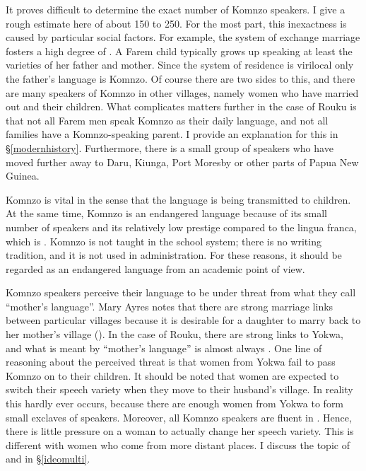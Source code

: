 It proves difficult to determine the exact number of Komnzo speakers. I give a rough estimate here of about 150 to 250. For the most part, this inexactness is caused by particular social factors. For example, the system of exchange marriage fosters a high degree of . A Farem child typically grows up speaking at least the varieties of her father and mother. Since the system of residence is virilocal only the father's language is Komnzo. Of course there are two sides to this, and there are many speakers of Komnzo in other villages, namely women who have married out and their children. What complicates matters further in the case of Rouku is that not all Farem men speak Komnzo as their daily language, and not all families have a Komnzo-speaking parent. I provide an explanation for this in {\S}\ref{modernhistory}. Furthermore, there is a small group of speakers who have moved further away to Daru, Kiunga, Port Moresby or other parts of Papua New Guinea.

Komnzo is vital in the sense that the language is being transmitted to children. At the same time, Komnzo is an endangered language because of its small number of speakers and its relatively low prestige compared to the lingua franca, which is . Komnzo is not taught in the school system; there is no writing tradition, and it is not used in administration. For these reasons, it should be regarded as an endangered language from an academic point of view.

Komnzo speakers perceive their language to be under threat from what they call ``mother's language''. Mary Ayres notes that there are strong marriage links between particular villages because it is desirable for a daughter to marry back to her mother's village (\citeyear[226]{Ayres:ws}). In the case of Rouku, there are strong links to Yokwa, and what is meant by ``mother's language'' is almost always . One line of reasoning about the perceived threat is that women from Yokwa fail to pass Komnzo on to their children. It should be noted that women are expected to switch their speech variety when they move to their husband's village. In reality this hardly ever occurs, because there are enough women from Yokwa to form small exclaves of  speakers. Moreover, all Komnzo speakers are fluent in . Hence, there is little pressure on a woman to actually change her speech variety. This is different with women who come from more distant places. I discuss the topic of  and  in {\S}\ref{ideomulti}.

